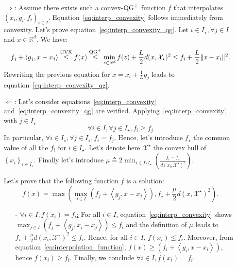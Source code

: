         \begin{itemize}
            \item[$\Rightarrow$:] Assume there exists such a convex-$\operatorname{QG}^+$ function $f$ that interpolates $(x_i, g_i, f_i)_{i \in I}$.
            Equation~\eqref{eq:interp_convexity} follows immediately from convexity.
            Let's prove equation~\eqref{eq:interp_convexity_qg}.
            Let $i \in I_\star, \forall j \in I$ and $x \in \mathbb{R}^d$.
            We have:
            \begin{equation*}
                f_j + \left< g_j, x - x_j \right> \overset{\text{CVX}}{\leq} f(x) \overset{\operatorname{QG}^+}{\leq} \min_{z \in \mathbb{R}^d} f(z) + \frac{L}{2}d(x, \mathcal{X}_\star)^2 \leq f_i + \frac{L}{2}\|x - x_i \|^2.
            \end{equation*}
            Rewriting the previous equation for $x = x_i + \frac{1}{L}g_j$ leads to equation~\eqref{eq:interp_convexity_qg}.

            \item[$\Leftarrow$:] Let's consider equations~\eqref{eq:interp_convexity} and~\eqref{eq:interp_convexity_qg} are verified.
            Applying~\eqref{eq:interp_convexity} with $j \in I_\star$
            \begin{equation}
                \forall i \in I, \forall j \in I_\star, f_i \geq f_j \label{eq:stationary_are_minima}
            \end{equation}
            In particular, $\forall i \in I_\star, \forall j \in I_\star, f_i = f_j$.
            Hence, let's introduce $f_\star$ the common value of all the $f_i$ for $i \in I_\star$.
            Let's denote here $\mathcal{X}^\star$ the convex hull of $\left\{x_i\right\}_{i \in I_\star}$.
            Finally let's introduce $\mu \triangleq 2 \min_{i \in I \setminus I_\star} \left( \frac{f_i - f_\star}{d(x_i, \mathcal{X}^\star)^2} \right)$.

            Let's prove that the following function $f$ is a solution:
            \begin{equation}
                f(x) = \max\left( \max_{j \in I} \left( f_j + \left< g_j, x - x_j \right> \right), f_\star + \frac{\mu}{2}d\left(x, \mathcal{X}^\star \right)^2 \right).
                \label{eq:interpolation_function}
            \end{equation}

            \begin{itemize}
                \item[-]\underline{$\forall i \in I, f(x_i) = f_i$:} For all $i \in I$, equation~\eqref{eq:interp_convexity} shows $\max_{j \in I} \left( f_j + \left< g_j, x_i - x_j \right> \right) \leq f_i$ and the definition of $\mu$ leads to $f_\star + \frac{\mu}{2}d\left(x_i, \mathcal{X}^\star \right)^2 \leq f_i$.
                Hence, for all $i \in I$, $f(x_i) \leq f_i$.
                Moreover, from equation~\eqref{eq:interpolation_function}, $f(x) \geq \left( f_i + \left< g_i, x - x_i \right> \right)$, hence $f(x_i) \geq f_i$.
                Finally, we conclude $\forall i \in I, f(x_i) = f_i$.


\end{itemize}
\end{itemize}
